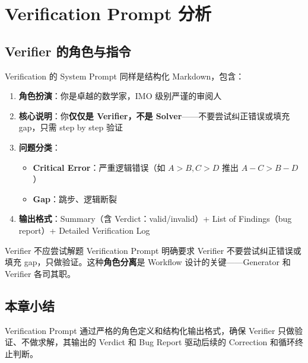 \section{Verification Prompt 分析}

\subsection{Verifier 的角色与指令}

Verification 的 System Prompt 同样是结构化 Markdown，包含：

\begin{enumerate}
    \item \textbf{角色扮演}：你是卓越的数学家，IMO 级别严谨的审阅人
    \item \textbf{核心说明}：你\textbf{仅仅是 Verifier，不是 Solver}——不要尝试纠正错误或填充 gap，只需 step by step 验证
    \item \textbf{问题分类}：
    \begin{itemize}
        \item \textbf{Critical Error}：严重逻辑错误（如 $A > B, C > D$ 推出 $A-C > B-D$）
        \item \textbf{Gap}：跳步、逻辑断裂
    \end{itemize}
    \item \textbf{输出格式}：Summary（含 Verdict：valid/invalid）+ List of Findings（bug report）+ Detailed Verification Log
\end{enumerate}

\begin{warningbox}{Verifier 不应尝试解题}
Verification Prompt 明确要求 Verifier 不要尝试纠正错误或填充 gap，只做验证。这种\textbf{角色分离}是 Workflow 设计的关键——Generator 和 Verifier 各司其职。
\end{warningbox}

\subsection{本章小结}

Verification Prompt 通过严格的角色定义和结构化输出格式，确保 Verifier 只做验证、不做求解，其输出的 Verdict 和 Bug Report 驱动后续的 Correction 和循环终止判断。

